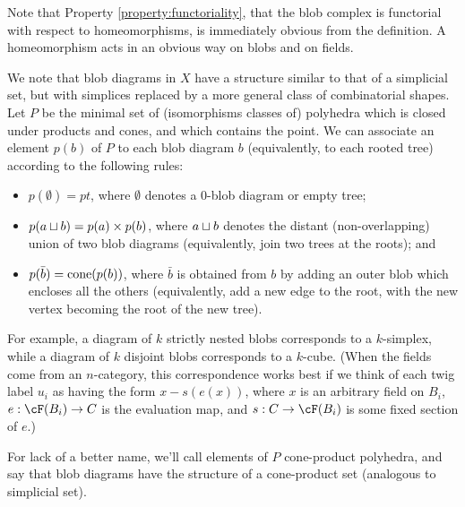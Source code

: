 Note that Property \ref{property:functoriality}, that the blob complex is functorial with respect to homeomorphisms, 
is immediately obvious from the definition.
A homeomorphism acts in an obvious way on blobs and on fields.

\begin{remark} \label{blobsset-remark} \rm
We note that blob diagrams in $X$ have a structure similar to that of a simplicial set,
but with simplices replaced by a more general class of combinatorial shapes.
Let $P$ be the minimal set of (isomorphisms classes of) polyhedra which is closed under products
and cones, and which contains the point.
We can associate an element $p(b)$ of $P$ to each blob diagram $b$ 
(equivalently, to each rooted tree) according to the following rules:
\begin{itemize}
\item $p(\emptyset) = pt$, where $\emptyset$ denotes a 0-blob diagram or empty tree;
\item $p(a \sqcup b) = p(a) \times p(b)$, where $a \sqcup b$ denotes the distant (non-overlapping) union 
of two blob diagrams (equivalently, join two trees at the roots); and
\item $p(\bar{b}) = \operatorname{cone}(p(b))$, where $\bar{b}$ is obtained from $b$ by adding an outer blob which 
encloses all the others (equivalently, add a new edge to the root, with the new vertex becoming the root
of the new tree).
\end{itemize}
For example, a diagram of $k$ strictly nested blobs corresponds to a $k$-simplex, while
a diagram of $k$ disjoint blobs corresponds to a $k$-cube.
(When the fields come from an $n$-category, this correspondence works best if we think of each 
twig label $u_i$ as having the form
$x - s(e(x))$, where $x$ is an arbitrary field on $B_i$, $e: \cF(B_i) \to C$ is the evaluation map, 
and $s:C \to \cF(B_i)$ is some fixed section of $e$.)

For lack of a better name, 
we'll call elements of $P$ cone-product polyhedra, 
and say that blob diagrams have the structure of a cone-product set (analogous to simplicial set).
\end{remark}

